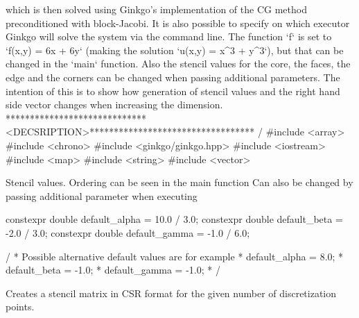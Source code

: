 {\begin{DoxyCode}
which is then solved \textcolor{keyword}{using} Ginkgo\textcolor{stringliteral}{'s implementation of the CG method}
\textcolor{stringliteral}{preconditioned with block-Jacobi. It is also possible to specify on which}
\textcolor{stringliteral}{executor Ginkgo will solve the system via the command line.}
\textcolor{stringliteral}{The function `f` is set to `f(x,y) = 6x + 6y` (making the solution `u(x,y) = x^3}
\textcolor{stringliteral}{+ y^3`), but that can be changed in the `main` function. Also the stencil values}
\textcolor{stringliteral}{for the core, the faces, the edge and the corners can be changed when passing}
\textcolor{stringliteral}{additional parameters.}
\textcolor{stringliteral}{}
\textcolor{stringliteral}{The intention of this is to show how generation of stencil values and the right}
\textcolor{stringliteral}{hand side vector changes when increasing the dimension.}
\textcolor{stringliteral}{*****************************<DECSRIPTION>********************************** /}
\textcolor{stringliteral}{}
\textcolor{stringliteral}{#include <array>}
\textcolor{stringliteral}{#include <chrono>}
\textcolor{stringliteral}{#include <ginkgo/ginkgo.hpp>}
\textcolor{stringliteral}{#include <iostream>}
\textcolor{stringliteral}{#include <map>}
\textcolor{stringliteral}{#include <string>}
\textcolor{stringliteral}{#include <vector>}
\end{DoxyCode}
}

{\ttfamily  Stencil values. Ordering can be seen in the main function Can also be changed by passing additional parameter when executing}

{\ttfamily 
\begin{DoxyCode}
constexpr \textcolor{keywordtype}{double} default\_alpha = 10.0 / 3.0;
constexpr \textcolor{keywordtype}{double} default\_beta = -2.0 / 3.0;
constexpr \textcolor{keywordtype}{double} default\_gamma = -1.0 / 6.0;

/ * Possible alternative \textcolor{keywordflow}{default} values are \textcolor{keywordflow}{for} example
 * default\_alpha = 8.0;
 * default\_beta = -1.0;
 * default\_gamma = -1.0;
 * /
\end{DoxyCode}
}

{\ttfamily  Creates a stencil matrix in C\+SR format for the given number of discretization points.}

